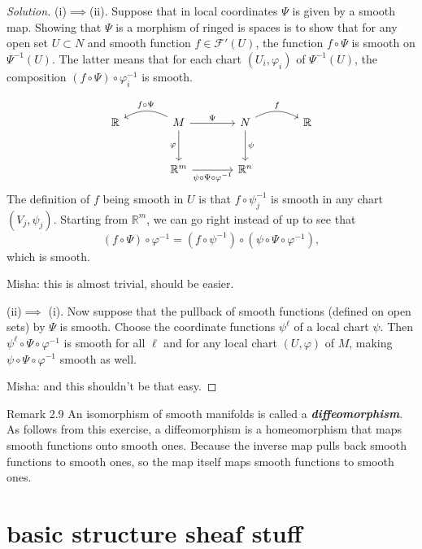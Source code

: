\begin{proof}[Solution]\leavevmode
(i)$\implies $(ii). Suppose that in local coordinates $\Psi$ is given by a smooth map. Showing that $\Psi$ is a morphism of ringed is spaces is to show that for any open set $U \subset N$ and smooth function $f \in\mathcal{F}'(U)$, the function $f \circ \Psi$ is smooth on $\Psi^{-1}(U)$. The latter means that for each chart $(U_i,\varphi_i)$ of $\Psi^{-1}(U)$, the composition  $(f \circ\Psi)\circ \varphi_i^{-1}$ is smooth.

\[\begin{tikzcd}[column sep=large,row sep=large]
	\mathbb{R}&M\arrow[r,"\Psi"]\arrow[d,swap,"\varphi"]\arrow[l,swap,"f \circ \Psi",bend right]& N\arrow[d,"\psi"]\arrow[r,"f",bend left]&\mathbb{R}\\
	&\mathbb{R}^m\arrow[r,"\psi\circ\Psi\circ \varphi^{-1}",swap]&\mathbb{R}^n
\end{tikzcd}\]
The definition of $f$ being smooth in $U$ is that  $f \circ \psi^{-1}_j$ is smooth in any chart $(V_j,\psi_j)$. Starting from $\mathbb{R}^m$, we can go right instead of up to see that
\[(f \circ \Psi)\circ \varphi^{-1}=(f \circ \psi^{-1}) \circ (\psi \circ \Psi \circ\varphi^{-1}),\]
which is smooth.

{\color{2}Misha: this is almost trivial, should be easier.}

(ii)$\implies $ (i). Now suppose that the pullback of smooth functions (defined on open sets) by $\Psi$ is smooth. Choose the coordinate functions $\psi^\ell$ of a local chart $\psi$. Then $\psi^\ell \circ \Psi \circ \varphi^{-1}$ is smooth for all $\ell$ and for any local chart $(U,\varphi)$ of $M$, making $\psi \circ \Psi \circ \varphi^{-1}$ smooth as well.

{\color{2}Misha: and this shouldn't be that easy.}
\end{proof}

\begin{thing5}{Remark 2.9}\label{rk:2.9}\leavevmode
An isomorphism of smooth manifolds is called a \textit{\textbf{diffeomorphism}}. As follows from this exercise, a diffeomorphism is a homeomorphism that maps smooth functions onto smooth ones. {\color{14}Because the inverse map pulls back smooth functions to smooth ones, so the map itself maps smooth functions to smooth ones.}
\end{thing5}

\section{basic structure sheaf stuff}

